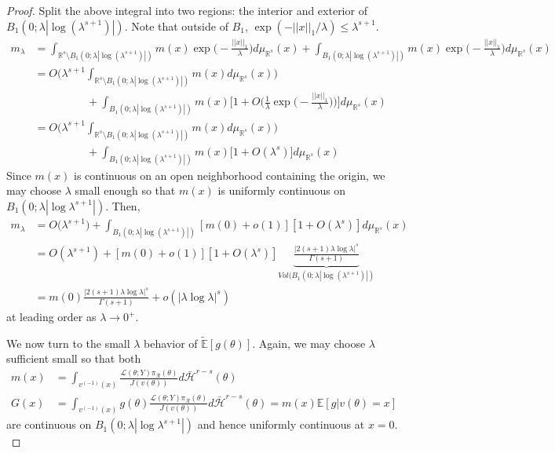 \documentclass[10pt,fleqn]{article}
\newcommand{\bb}[1]{\mathbb{#1}} \newcommand{\mc}[1]{\mathcal{#1}}
\DeclareMathOperator{\1}{\mathbbm{1}} \DeclareMathOperator{\bigO}{\mc O}
\begin{document}
\begin{proof}
Split the above integral into two regions: the interior and exterior of $B_1(0;\lambda|\log(\lambda^{s+1})|)$. Note that outside of $B_1$, $\exp(-||x||_1/\lambda) \le \lambda^{s+1}.$
\begin{align*}
m_\lambda &= \int_{\mathbb{R}^s \setminus B_1(0;\lambda|\log(\lambda^{s+1})|)}m(x) \exp\bigg(-\frac{||x||_1}{\lambda}\bigg)d\mu_{\mathbb{R}^s}(x) + \int_{B_1(0;\lambda|\log(\lambda^{s+1})|)}m(x) \exp\bigg(-\frac{||x||_1}{\lambda}\bigg)d\mu_{\mathbb{R}^s}(x) \\
&=O\bigg( \lambda^{s+1} \int_{\mathbb{R}^s \setminus B_1(0;\lambda|\log(\lambda^{s+1})|)}m(x) d\mu_{\mathbb{R}^s}(x)\bigg) \\
&\hspace{2cm}+ \int_{B_1(0;\lambda|\log(\lambda^{s+1})|)} m(x) \bigg[1+O\bigg(\frac{1}{\lambda}\exp\bigg(-\frac{||x||_1}{\lambda}\bigg)\bigg)\bigg]d\mu_{\mathbb{R}^s}(x) \\
&=O\bigg( \lambda^{s+1} \int_{\mathbb{R}^s \setminus B_1(0;\lambda|\log(\lambda^{s+1})|)}m(x) d\mu_{\mathbb{R}^s}(x)\bigg) \\
&\hspace{2cm}+ \int_{B_1(0;\lambda|\log(\lambda^{s+1})|)} m(x) \bigg[1+O(\lambda^s) \bigg]d\mu_{\mathbb{R}^s}(x)
\end{align*}
Since $m(x)$ is continuous on an open neighborhood containing the origin, we may choose $\lambda$ small enough so that $m(x)$ is uniformly continuous on $B_1(0;\lambda |\log \lambda^{s+1}|).$ Then, 
\begin{align*}
m_\lambda&= O\bigg( \lambda^{s+1} \bigg) + \int_{B_1(0;\lambda|\log(\lambda^{s+1})|)} [m(0) + o(1)][1+O(\lambda^s)] d\mu_{\mathbb{R}^s} (x) \\
&= O(\lambda^{s+1}) + [m(0)+o(1)][1+ O(\lambda^s)] \underbrace{\frac{|2(s+1)\lambda \log \lambda |^s}{\Gamma(s+1)}}_{Vol(B_1(0;\lambda|\log(\lambda^{s+1})|)}   \\
&= m(0) \frac{|2(s+1)\lambda \log \lambda |^s}{\Gamma(s+1)} + o(|\lambda \log \lambda|^s) 
\end{align*}
at leading order as $\lambda\to 0^+$.


We now turn to the small $\lambda$ behavior of $\tilde{\bb E}[g(\theta)].$  Again, we may choose $\lambda$ sufficient small so that both
\begin{align*}
m(x)&= \int_{v^{(-1)}(x)} \frac{\mathcal{L}(\theta;Y)\pi_\mathcal{R}(\theta)}{J(v(\theta))} d\bar{\mathcal{H}}^{r-s}(\theta)   \\
G(x)&= \int_{v^{(-1)}(x)} g(\theta) \frac{\mathcal{L}(\theta;Y)\pi_\mathcal{R}(\theta)}{J(v(\theta))} d\bar{\mathcal{H}}^{r-s}(\theta) =m(x)\bb E[g|v(\theta)=x]
\end{align*}
are continuous on $B_1(0;\lambda|\log \lambda^{s+1}|)$ and hence uniformly continuous at $x=0.$ 


\end{proof}
\end{document}
